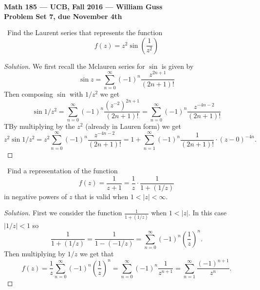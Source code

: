 \documentclass[11pt]{amsart}
\theoremstyle{definition}
\numberwithin{theorem}{section}
\numberwithin{definition}{section}
\numberwithin{equation}{section}
\newenvironment{solution}
  {\begin{proof}[Solution]}
  {\end{proof}}
\begin{document}
\begin{center}{\bf Math 185 --- UCB, Fall 2016 --- William Guss}
\\
{\bf Problem Set 7, due November 4th}
\end{center}
\medskip {}\ Find the Laurent series that represents the function
\begin{equation*}
	f(z) = z^2 \sin\left(\frac{1}{z^2}\right)
\end{equation*}
\begin{solution}
	We first recall the Mclauren series for $\sin$ is given by
	\begin{equation*}
		\sin z = \sum_{n=0}^\infty (-1)^n \frac{z^{2n+1}}{(2n+1)!}	
	\end{equation*}
	Then composing $\sin$ with $1/z^2$ we get
	\begin{equation*}
		\sin 1/z^2 = \sum_{n=0}^\infty (-1)^n \frac{{\left(z^{-2}\right)}^{2n+1}}{(2n+1)!}	=  \sum_{n=0}^\infty (-1)^n \frac{{z}^{-4n-2}}{(2n+1)!}	
	\end{equation*}
	TBy multiplying by the $z^2$ (already in Lauren form) we get
	\begin{equation*}
	z^2 \sin 1/z^2 = z^2 \sum_{n=0}^\infty (-1)^n \frac{{z}^{-4n-2}}{(2n+1)!}	 = 1 + \sum_{n=1}^\infty (-1)^n \frac{1}{(2n+1)!}\cdot {(z-0)}^{-4n}.	
	\end{equation*}
\end{solution}

\medskip {}\ Find a representation of the function
\begin{equation*}
	f(z) = \frac{1}{z+1} = \frac{1}{z}\cdot \frac{1}{1 + (1/z)}
\end{equation*}
in negative powers of $z$ that is valid when $1 < |z| < \infty$.
\begin{solution}
	First we consider the function $\frac{1}{1 + (1/z)}$ when $1 < |z|.$ In this case $|1/z| < 1$
	so \begin{equation*}
		\frac{1}{1 + (1/z)} = \frac{1}{1 - (-1/z)} = \sum_{n=0}^\infty (-1)^n \left(\frac{1}{z}\right)^n.
	\end{equation*}
	Then multiplying by $1/z$ we get that
	\begin{equation*}
		f(z) = \frac{1}{z}\sum_{n=0}^\infty (-1)^n \left(\frac{1}{z}\right)^n = \sum_{n=0}^\infty (-1)^n \frac{1}{z^{n+1}} = \sum_{n=1}^\infty \frac{ (-1)^{n+1}}{z^{n}}.
	\end{equation*}
\end{solution}
\end{document}
